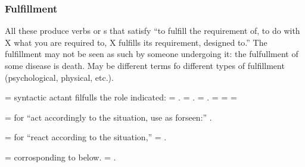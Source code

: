\subsubsection*{Fulfillment}
All these produce verbs or s that satisfy ``to fulfill the
requirement of, to do with X what you are required to, X fulfills its
requirement, designed to.'' The fulfillment may not be seen as such by
someone undergoing it: the fulfullment of some disease is death.  May
be different terms fo different types of fulfillment (psychological,
physical, etc.).

\begin{multicols}{2}
 = syntactic actant  filfulls the role indicated:
 = .
 = .
 = .
 = 
 = 
 = 

 =  for ``act accordingly to the situation, use as
forseen:'' .

 =  for ``react according to the situation,''
 = . 

 =  corrosponding to  below.
 = .
\end{multicols}


